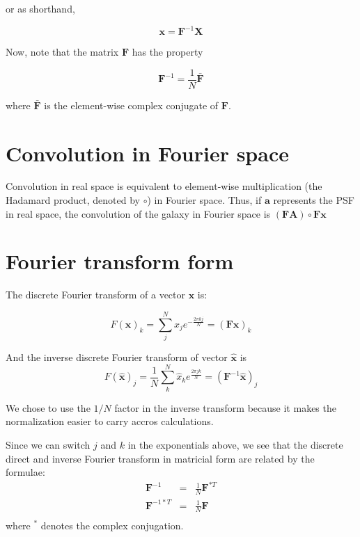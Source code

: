 \documentclass[12pt]{article}
\newcommand{\x}{\mathbf{x}}
\newcommand{\xhat}{\mathbf{\hat x}}
\newcommand{\A}{\mathbf{A}}
\newcommand{\avec}{\mathbf{a}}
\newcommand{\F}{\mathbf{F}}
\begin{document}
or as shorthand,

\begin{equation}
\mathbf{x} = \mathbf{F}^{-1} \mathbf{X}
\end{equation}

Now, note that the matrix $\mathbf{F}$ has the property

\begin{equation}
\mathbf{F}^{-1} = \frac{1}{N} \bar{\mathbf{F}}
\end{equation}

where $\bar{\mathbf{F}}$ is the element-wise complex
conjugate of $\mathbf{F}$.

\section{Convolution in Fourier space}

Convolution in real space is equivalent to element-wise multiplication (the
Hadamard product, denoted by $\circ$) in Fourier space. Thus, if $\avec$
represents the PSF in real space, the convolution of the galaxy in Fourier
space is $(\F\A) \circ \F\x$




\section{Fourier transform form}

The discrete Fourier transform of a vector $\x$ is:

\begin{equation}
  \label{eq:7}
  F(\x)_{k} = \sum_{j}^{N} x_{j} e^{- \frac{2\pi k j}{N}} = (\F \x)_{k}
\end{equation}

And the inverse discrete Fourier transform of vector $\xhat$ is
\begin{equation}
  \label{eq:8}
  F(\xhat)_{j} = \frac{1}{N} \sum_{k}^{N} \hat x_{k} e^{ \frac{2\pi j k}{N}} =
  (\F^{-1} \xhat)_{j}
\end{equation}

We chose to use the $1/N$ factor in the inverse transform because it makes the
normalization easier to carry accros calculations.

Since we can switch $j$ and $k$ in the exponentials above, we see that the
discrete direct and inverse Fourier transform in matricial form are related by
the formulae:
\begin{eqnarray*}
  \label{eq:9}
  \F^{-1} & = &\frac{1}{N} \F^{*T} \\
  \F^{-1*T} & = &\frac{1}{N} \F \\
\end{eqnarray*}
where $^{*}$ denotes the complex conjugation.
\end{document}
